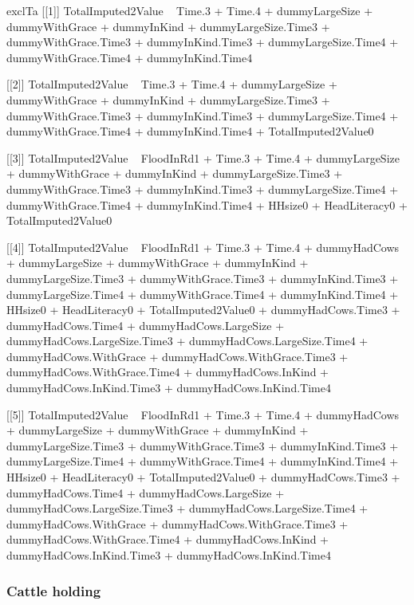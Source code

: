 \begin{Schunk}
\begin{Soutput}
[1] exclTa
[[1]]
TotalImputed2Value ~ Time.3 + Time.4 + dummyLargeSize + dummyWithGrace + 
    dummyInKind + dummyLargeSize.Time3 + dummyWithGrace.Time3 + 
    dummyInKind.Time3 + dummyLargeSize.Time4 + dummyWithGrace.Time4 + 
    dummyInKind.Time4

[[2]]
TotalImputed2Value ~ Time.3 + Time.4 + dummyLargeSize + dummyWithGrace + 
    dummyInKind + dummyLargeSize.Time3 + dummyWithGrace.Time3 + 
    dummyInKind.Time3 + dummyLargeSize.Time4 + dummyWithGrace.Time4 + 
    dummyInKind.Time4 + TotalImputed2Value0

[[3]]
TotalImputed2Value ~ FloodInRd1 + Time.3 + Time.4 + dummyLargeSize + 
    dummyWithGrace + dummyInKind + dummyLargeSize.Time3 + dummyWithGrace.Time3 + 
    dummyInKind.Time3 + dummyLargeSize.Time4 + dummyWithGrace.Time4 + 
    dummyInKind.Time4 + HHsize0 + HeadLiteracy0 + TotalImputed2Value0

[[4]]
TotalImputed2Value ~ FloodInRd1 + Time.3 + Time.4 + dummyHadCows + 
    dummyLargeSize + dummyWithGrace + dummyInKind + dummyLargeSize.Time3 + 
    dummyWithGrace.Time3 + dummyInKind.Time3 + dummyLargeSize.Time4 + 
    dummyWithGrace.Time4 + dummyInKind.Time4 + HHsize0 + HeadLiteracy0 + 
    TotalImputed2Value0 + dummyHadCows.Time3 + dummyHadCows.Time4 + 
    dummyHadCows.LargeSize + dummyHadCows.LargeSize.Time3 + dummyHadCows.LargeSize.Time4 + 
    dummyHadCows.WithGrace + dummyHadCows.WithGrace.Time3 + dummyHadCows.WithGrace.Time4 + 
    dummyHadCows.InKind + dummyHadCows.InKind.Time3 + dummyHadCows.InKind.Time4

[[5]]
TotalImputed2Value ~ FloodInRd1 + Time.3 + Time.4 + dummyHadCows + 
    dummyLargeSize + dummyWithGrace + dummyInKind + dummyLargeSize.Time3 + 
    dummyWithGrace.Time3 + dummyInKind.Time3 + dummyLargeSize.Time4 + 
    dummyWithGrace.Time4 + dummyInKind.Time4 + HHsize0 + HeadLiteracy0 + 
    TotalImputed2Value0 + dummyHadCows.Time3 + dummyHadCows.Time4 + 
    dummyHadCows.LargeSize + dummyHadCows.LargeSize.Time3 + dummyHadCows.LargeSize.Time4 + 
    dummyHadCows.WithGrace + dummyHadCows.WithGrace.Time3 + dummyHadCows.WithGrace.Time4 + 
    dummyHadCows.InKind + dummyHadCows.InKind.Time3 + dummyHadCows.InKind.Time4
\end{Soutput}
\end{Schunk}

\subsubsection{Cattle holding}

